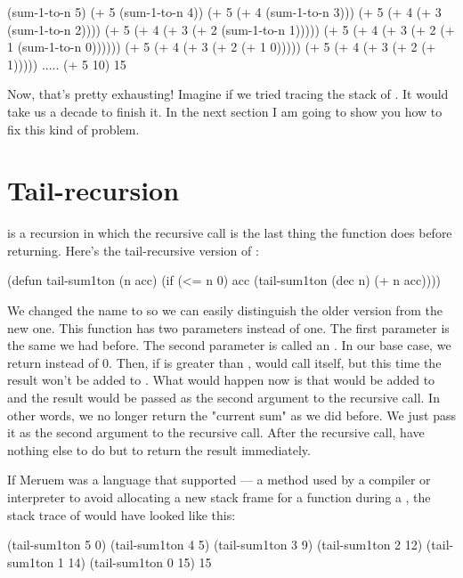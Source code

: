 \begin{REPL}
(sum-1-to-n 5)
(+ 5 (sum-1-to-n 4))
(+ 5 (+ 4 (sum-1-to-n 3)))
(+ 5 (+ 4 (+ 3 (sum-1-to-n 2))))
(+ 5 (+ 4 (+ 3 (+ 2 (sum-1-to-n 1)))))
(+ 5 (+ 4 (+ 3 (+ 2 (+ 1 (sum-1-to-n 0))))))
(+ 5 (+ 4 (+ 3 (+ 2 (+ 1 0)))))
(+ 5 (+ 4 (+ 3 (+ 2 (+ 1)))))
.....
(+ 5 10)
15
\end{REPL}

Now, that's pretty exhausting! Imagine if we tried tracing the stack of . It would take us a decade to finish it. In the next section I am going to show you how to fix this kind of problem.

\section{Tail-recursion}
 is a recursion in which the recursive call is the last thing the function does before returning. Here's the tail-recursive version of :

\begin{Meruem}
(defun tail-sum1ton (n acc)
  (if (<= n 0)
    acc
    (tail-sum1ton (dec n) (+ n acc))))
\end{Meruem}

We changed the name to  so we can easily distinguish the older version from the new one. This function has two parameters instead of one. The first parameter is the same  we had before. The second parameter is called an . In our base case, we return  instead of 0. Then, if  is greater than ,  would call itself, but this time the result won't be added to . What would happen now is that  would be added to  and the result would be passed as the second argument to the recursive call. In other words, we no longer return the "current sum" as we did before. We just pass it as the second argument to the recursive call. After the recursive call,  have nothing else to do but to return the result immediately. 

If Meruem was a language that supported  --- a method used by a compiler or interpreter to avoid allocating a new stack frame for a function during a , the stack trace of  would have looked like this:

\begin{REPL}
(tail-sum1ton 5 0)
(tail-sum1ton 4 5)
(tail-sum1ton 3 9)
(tail-sum1ton 2 12)
(tail-sum1ton 1 14)
(tail-sum1ton 0 15)
15
\end{REPL}


